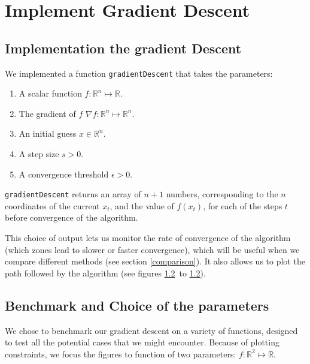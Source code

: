 \section{Implement Gradient Descent}
\subsection{Implementation the gradient Descent}
We implemented a function {\tt gradientDescent}  that takes the parameters:
\begin{enumerate}[-]
\item A scalar function $f: \mathbb{R}^n \mapsto \mathbb{R}$.
\item The gradient of $f$ $\nabla f: \mathbb{R}^n \mapsto \mathbb{R}^n$.
\item An initial guess $x \in \mathbb{R}^n$.
\item A step size $s > 0$.
\item A convergence threshold $\epsilon > 0$.
\end{enumerate}
 {\tt gradientDescent} returns an array of $n+1$ numbers, corresponding to the $n$ coordinates of the current $x_t$, and the value of $f(x_t)$, for each of the steps $t$ before convergence of the algorithm.
 
 This choice of output lets us monitor the rate of convergence of the algorithm (which zones lead to slower or faster convergence), which will be useful when we compare different methods (see section \ref{comparison}). It also allows us to plot the path followed by the algorithm (see figures \ref{} to \ref{}).

\subsection{Benchmark and Choice of the parameters}

We chose to benchmark our gradient descent on a variety of functions, designed to test all the potential cases that we might encounter. Because of plotting constraints, we focus the figures to function of two parameters:  $f: \mathbb{R}^2 \mapsto \mathbb{R}$.


